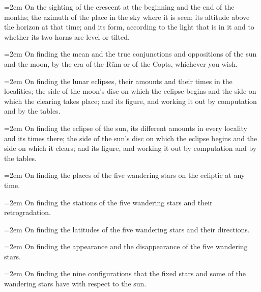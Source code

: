 \documentclass[11pt]{article}
\newcommand{\ArPage}[1]{\marginpar{\footnotesize\color{gray}Ar.\,p.\,#1}}
\begin{document}
\par\noindent\hangindent=2em On the sighting of the crescent at the beginning and the end of the months; the azimuth of the place in the sky where it is seen; its altitude above the horizon at that time; and its form, according to the light that is in it and to whether its two horns are level or tilted.\par
\par\noindent\hangindent=2em On finding the mean and the true conjunctions and oppositions of the sun and the moon, by the era of the Rūm or of the Copts, whichever you wish.\par
\par\noindent\hangindent=2em On finding the lunar eclipses, their amounts and their times in the localities; the side of the moon's disc on which the eclipse begins and the side on which the clearing takes place; and its figure, and working it out by computation and by the tables.\par
\par\noindent\hangindent=2em \ArPage{5}On finding the eclipse of the sun, its different amounts in every locality and its times there; the side of the sun's disc on which the eclipse begins and the side on which it clears; and its figure, and working it out by computation and by the tables.\par
\par\noindent\hangindent=2em On finding the places of the five wandering stars on the ecliptic at any time.\par
\par\noindent\hangindent=2em On finding the stations of the five wandering stars and their retrogradation.\par
\par\noindent\hangindent=2em On finding the latitudes of the five wandering stars and their directions.\par
\par\noindent\hangindent=2em On finding the appearance and the disappearance of the five wandering stars.\par
\par\noindent\hangindent=2em On finding the nine configurations that the fixed stars and some of the wandering stars have with respect to the sun.\par
\end{document}
